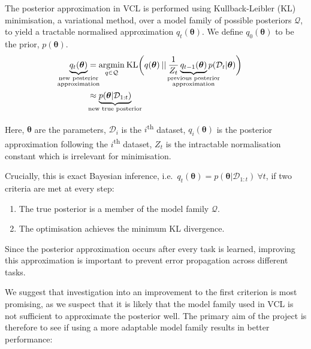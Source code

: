 \documentclass[a4paper,11pt]{article}
\let\boldtheta\theta %
\renewcommand{\theta}{\boldsymbol{\boldtheta}} %
\begin{document}
The posterior approximation in VCL is performed using Kullback-Leibler (KL) minimisation, a variational method, over a model family of possible posteriors $\mathcal{Q}$, to yield a tractable normalised approximation $q_t(\theta)$. We define $q_0(\theta)$ to be the prior, $p(\theta)$.
\vspace{-0.5em}
\begin{equation}\label{eq:3}
\begin{split}
\underbrace{q_t(\theta)}_{\mathclap{\substack{\text{new posterior}\\ \text{approximation}}}} &=\underset{q\in\mathcal{Q}}{\mathrm{arg}\mathrm{min}} \: \mathrm{KL}\bigg(q(\theta)\:||\:\frac{1}{Z_t}\underbrace{q_{t-1}(\theta)}_{\mathclap{\substack{\text{previous posterior} \\ \text{approximation}}}}p(\mathcal{D}_t|\theta) \bigg)\\
& \approx \underbrace{p(\theta | \mathcal{D}_{1:t})}_{\mathclap{\substack{\text{new true posterior}}}}
\end{split}
\end{equation}

Here, $\theta$ are the parameters, $\mathcal{D}_i$ is the $i$\textsuperscript{th} dataset, $q_i(\theta)$ is the posterior approximation following the $i$\textsuperscript{th} dataset, $Z_t$ is the intractable normalisation constant which is irrelevant for minimisation.

Crucially, this is exact Bayesian inference, i.e.\ $q_t(\theta)=p(\theta | \mathcal{D}_{1:t}) \: \forall t$, if two criteria are met at every step:

\begin{enumerate}
\item The true posterior is a member of the model family $\mathcal{Q}$.
\item The optimisation achieves the minimum KL divergence.
\end{enumerate}

Since the posterior approximation occurs after every task is learned, improving this approximation is important to prevent error propagation across different tasks.

We suggest that investigation into an improvement to the first criterion is most promising, as we suspect that it is likely that the model family used in VCL is not sufficient to approximate the posterior well. The primary aim of the project is therefore to see if using a more adaptable model family results in better performance:
\end{document}
